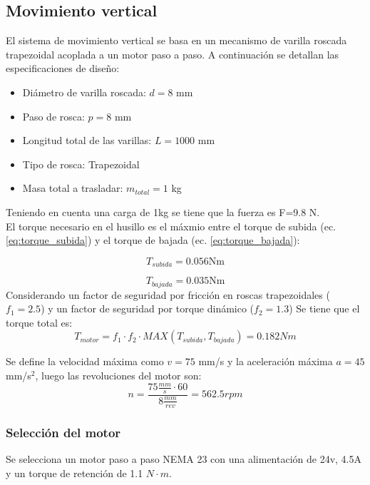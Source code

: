 \subsection{Movimiento vertical}
\label{sec:mov_vertical_prototipo}

El sistema de movimiento vertical se basa en un mecanismo de varilla roscada trapezoidal acoplada a un motor paso a paso. A continuación se detallan las especificaciones de diseño:

\begin{itemize}[label=$\bullet$]
    \item Diámetro de varilla roscada: $d = 8$ mm
    \item Paso de rosca: $p = 8$ mm
    \item Longitud total de las varillas: $L = 1000$ mm
    \item Tipo de rosca: Trapezoidal
    \item Masa total a trasladar: $m_{total} = 1$ kg
\end{itemize}

Teniendo en cuenta una carga de 1kg se tiene que la fuerza es F=9.8 N. \\

El torque necesario en el husillo es el máxmio entre el torque de subida (ec. \ref{eq:torque_subida}) y el torque de bajada (ec. \ref{eq:torque_bajada}):

\begin{equation}
T_{subida}= 0.056\text{Nm}
\end{equation}

\begin{equation}
T_{bajada}= 0.035 \text{Nm}
\end{equation}
Considerando un factor de seguridad por fricción en roscas trapezoidales (\(f_1=2.5\)) y un factor de seguridad por torque dinámico (\(f_2=1.3\))
Se tiene que el torque total es: 
\[T_{motor}=f_1 \cdot f_2 \cdot MAX(T_{subida}, T_{bajada})= 0.182Nm\]

Se define la velocidad máxima como $v = 75$ mm/s y la aceleración máxima $a = 45$ mm/s$^2$, luego las revoluciones del motor son:
\[n= \frac{ 75 \frac{mm}{s} \cdot 60}{8 \frac{mm}{rev}}=562.5 rpm\]

\subsubsection{Selección del motor}

Se selecciona un motor paso a paso NEMA 23 con una alimentación de 24v, 4.5A y un torque de retención de 1.1 \(N \cdot m\).

